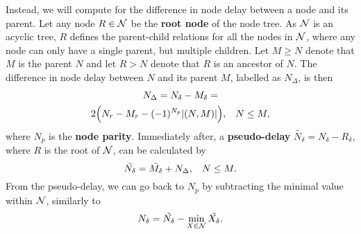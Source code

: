 Instead, we will compute for the difference in node delay between a node and its parent. Let any node $R\in\mathcal{N}$ be the \textbf{root node} of the node tree. As $\mathcal{N}$ is an acyclic tree, $R$ defines the parent-child relations for all the nodes in $\mathcal{N}$, where any node can only have a single parent, but multiple children. Let $M\geq N$ denote that $M$ is the parent $N$ and let $R > N$ denote that $R$ is an ancestor of $N$. The difference in node delay between $N$ and its parent $M$, labelled as $N_\Delta$, is then
\begin{multline}\label{eq:pmwdif}
    N_\Delta = N_\delta - M_\delta = \\
    2\Big(N_r-M_r - (-1)^{N_p}\lvert(N,M)\rvert\Big), \hspace{.3cm} N\leq M,
\end{multline}
where $N_p$ is the \textbf{node parity}. Immediately after, a \textbf{pseudo-delay} $\tilde{N_\delta} = N_\delta - R_\delta$, where $R$ is the root of $\mathcal{N}$, can be calculated by
\begin{equation}\label{eq:pseudodelay}
    \tilde{N_\delta} = \tilde{M_\delta} + N_\Delta, \hspace{.3cm} N\leq M.
\end{equation}
From the pseudo-delay, we can go back to $N_p$ by subtracting the minimal value within $\mathcal{N}$, similarly to 
\begin{equation}
    N_\delta = \tilde{N_\delta} - \min_{X \in \mathcal{N}}{\tilde{X_\delta}}. 
\end{equation}

